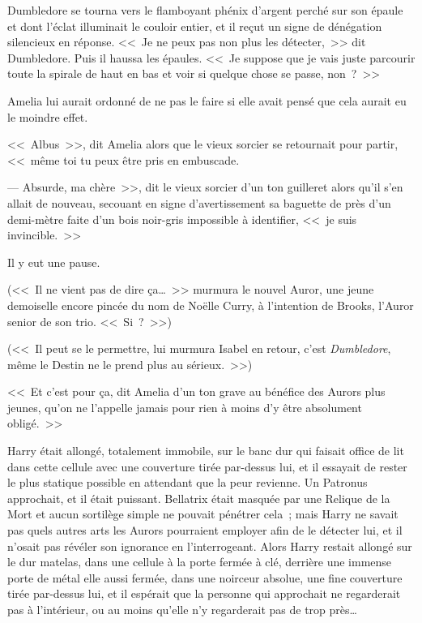 Dumbledore se tourna vers le flamboyant phénix d'argent perché sur son épaule et dont l'éclat illuminait le couloir entier, et il reçut un signe de dénégation silencieux en réponse. <<~Je ne peux pas non plus les détecter,~>> dit Dumbledore. Puis il haussa les épaules. <<~Je suppose que je vais juste parcourir toute la spirale de haut en bas et voir si quelque chose se passe, non~?~>>

Amelia lui aurait ordonné de ne pas le faire si elle avait pensé que cela aurait eu le moindre effet.

<<~Albus~>>, dit Amelia alors que le vieux sorcier se retournait pour partir, <<~même toi tu peux être pris en embuscade.

--- Absurde, ma chère~>>, dit le vieux sorcier d'un ton guilleret alors qu'il s'en allait de nouveau, secouant en signe d'avertissement sa baguette de près d'un demi-mètre faite d'un bois noir-gris impossible à identifier, <<~je suis invincible.~>>

Il y eut une pause.

(<<~Il ne vient pas de dire ça…~>> murmura le nouvel Auror, une jeune demoiselle encore pincée du nom de Noëlle Curry, à l'intention de Brooks, l'Auror senior de son trio. <<~Si~?~>>)

(<<~Il peut se le permettre, lui murmura Isabel en retour, c'est \emph{Dumbledore}, même le Destin ne le prend plus au sérieux.~>>)

<<~Et c'est pour ça, dit Amelia d'un ton grave au bénéfice des Aurors plus jeunes, qu'on ne l'appelle jamais pour rien à moins d'y être absolument obligé.~>>

\later

Harry était allongé, totalement immobile, sur le banc dur qui faisait office de lit dans cette cellule avec une couverture tirée par-dessus lui, et il essayait de rester le plus statique possible en attendant que la peur revienne. Un Patronus approchait, et il était puissant. Bellatrix était masquée par une Relique de la Mort et aucun sortilège simple ne pouvait pénétrer cela~; mais Harry ne savait pas quels autres arts les Aurors pourraient employer afin de le détecter lui, et il n'osait pas révéler son ignorance en l'interrogeant. Alors Harry restait allongé sur le dur matelas, dans une cellule à la porte fermée à clé, derrière une immense porte de métal elle aussi fermée, dans une noirceur absolue, une fine couverture tirée par-dessus lui, et il espérait que la personne qui approchait ne regarderait pas à l'intérieur, ou au moins qu'elle n'y regarderait pas de trop près…

